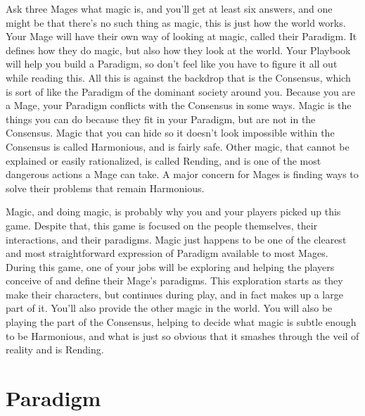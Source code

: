\documentclass[
  oneside,
  statementpaper,
  9pt]{memoir}
\begin{document}
\begin{Player}

Ask three Mages what magic is, and you'll get at least six answers, and one might be that there's no such thing as magic, this is just how the world works. Your Mage will have their own way of looking at magic, called their Paradigm. It defines how they do magic, but also how they look at the world. Your Playbook will help you build a Paradigm, so don't feel like you have to figure it all out while reading this. All this is against the backdrop that is the Consensus, which is sort of like the Paradigm of the dominant society around you. Because you are a Mage, your Paradigm conflicts with the Consensus in some ways. Magic is the things you can do because they fit in your Paradigm, but are not in the Consensus. Magic that you can hide so it doesn't look impossible within the Consensus is called Harmonious, and is fairly safe. Other magic, that cannot be explained or easily rationalized, is called Rending, and is one of the most dangerous actions a Mage can take. A major concern for Mages is finding ways to solve their problems that remain Harmonious.

\end{Player}

\begin{MC}

Magic, and doing magic, is probably why you and your players picked up this game. Despite that, this game is focused on the people themselves, their interactions, and their paradigms. Magic just happens to be one of the clearest and most straightforward expression of Paradigm available to most Mages. During this game, one of your jobs will be exploring and helping the players conceive of and define their Mage's paradigms. This exploration starts as they make their characters, but continues during play, and in fact makes up a large part of it. You'll also provide the other magic in the world. You will also be playing the part of the Consensus, helping to decide what magic is subtle enough to be Harmonious, and what is just so obvious that it smashes through the veil of reality and is Rending.

\end{MC}

\hypertarget{paradigm}{%
\section{Paradigm}\label{paradigm}}
\end{document}
